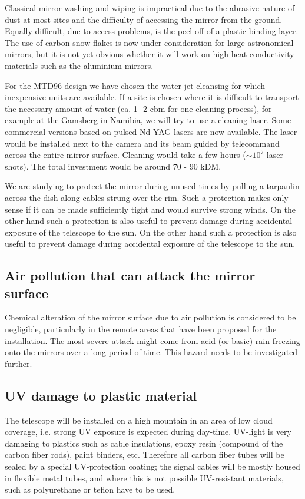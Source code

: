 Classical mirror washing and wiping is impractical due to the abrasive
nature of dust at most sites and the difficulty of accessing the mirror from
the ground. Equally difficult, due to access problems, is the peel-off of a
plastic binding layer. The use of carbon snow flakes is now under
consideration for large astronomical mirrors, but it is not yet obvious
whether it will work on high heat conductivity materials such as the
aluminium mirrors.

For the MTD96 design we have chosen the water-jet cleansing for which
inexpensive units are available. If a site is chosen where it is difficult
to transport the necessary amount of water (ca. 1 -2 cbm for one cleaning
process), for example at the Gamsberg in Namibia, we will try to use a
cleaning laser. Some commercial versions based on pulsed Nd-YAG lasers are
now available. The laser would be installed next to the camera and its beam
guided by telecommand across the entire mirror surface. Cleaning would take
a few hours ($\sim 10^7$ laser shots). The total investment would be around
70 - 90 kDM.

We are studying to protect the mirror during unused times by pulling a
tarpaulin across the dish along cables strung over the rim. Such a
protection makes only sense if it can be made sufficiently tight and would
survive strong winds. On the other hand such a protection is also useful to prevent
damage during accidental exposure of the telescope to the sun. On the other hand such a
protection is also useful to prevent
damage during accidental exposure of the telescope to the sun.

\subsection{Air pollution that can attack the mirror surface}

\medskip Chemical alteration of the mirror surface due to air pollution is considered
to be negligible, particularly in the remote areas that have been proposed
for the installation. The most severe attack might come from acid (or basic)
rain freezing onto the mirrors over a long period of time. This hazard needs
to be investigated further.

\subsection{UV damage to plastic material}

\medskip The telescope will be installed on a high mountain in an area of low cloud
coverage, i.e. strong UV exposure is expected during day-time. UV-light is
very damaging to plastics such as cable insulations, epoxy resin (compound
of the carbon fiber rods), paint binders, etc. Therefore all carbon fiber
tubes will be sealed by a special UV-protection coating; the signal cables
will be mostly housed in flexible metal tubes, and where this is not possible
UV-resistant materials, such as polyurethane or teflon have to be used.

